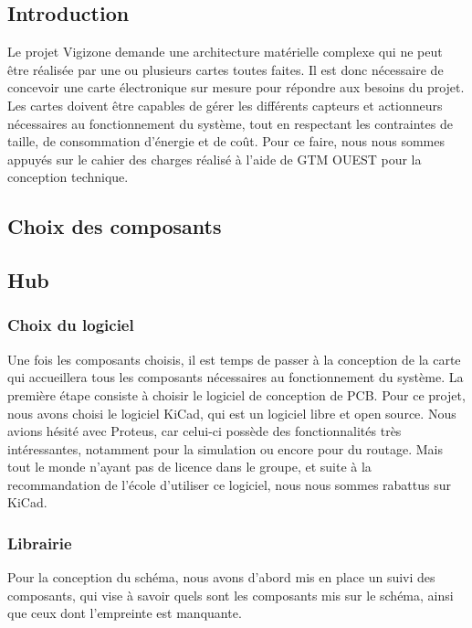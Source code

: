 \subsection{Introduction}
 
Le projet Vigizone demande une architecture matérielle complexe qui ne peut être réalisée par une ou plusieurs cartes toutes faites.
Il est donc nécessaire de concevoir une carte électronique sur mesure pour répondre aux besoins du projet.
Les cartes doivent être capables de gérer les différents capteurs et actionneurs nécessaires au fonctionnement du système, tout en respectant les contraintes de taille, de consommation d'énergie et de coût.
Pour ce faire, nous nous sommes appuyés sur le cahier des charges réalisé à l'aide de GTM OUEST pour la conception technique.


\subsection{Choix des composants}


\subsection{Hub}

\subsubsection{Choix du logiciel}
Une fois les composants choisis, il est temps de passer à la conception de la carte
qui accueillera tous les composants nécessaires au fonctionnement du système.
La première étape consiste à choisir le logiciel de conception de PCB.
Pour ce projet, nous avons choisi le logiciel KiCad, qui est un logiciel libre et open source.
Nous avions hésité avec Proteus, car celui-ci possède des fonctionnalités très intéressantes, notamment pour la simulation ou encore pour du routage.
Mais tout le monde n'ayant pas de licence dans le groupe, et suite à la recommandation de l'école d'utiliser ce logiciel, nous nous sommes rabattus sur KiCad.

\subsubsection{Librairie}

Pour la conception du schéma, nous avons d'abord mis en place un suivi des composants,
qui vise à savoir quels sont les composants mis sur le schéma, ainsi que ceux dont l'empreinte est manquante.

